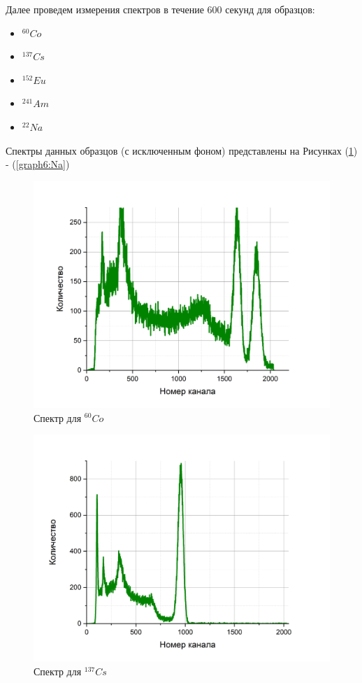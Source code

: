 \documentclass[a4paper,12pt]{article}
\begin{document}
Далее проведем измерения спектров в течение 600 секунд для образцов:

\begin{itemize}
\item $^{60}Co$
\item $^{137}Cs$
\item $^{152}Eu$
\item $^{241}Am$
\item $^{22}Na$
\end{itemize}
  
 
Спектры данных образцов (с исключенным фоном) представлены на Рисунках (\ref{graph2:Co}) - (\ref{graph6:Na}) 
 
\newpage 
 
\begin{figure}[h!]
	\centering
	\includegraphics[width=0.8\linewidth]{graph3}
	\caption{Спектр для $^{60}Co$}
	\label{graph2:Co}
\end{figure}

\begin{figure}[h!]
	\centering
	\includegraphics[width=0.8\linewidth]{graph4}
	\caption{Спектр для  $^{137}Cs$}
	\label{graph3:Cs}
\end{figure}
\end{document}
